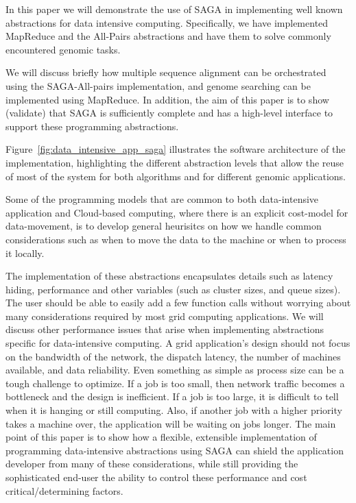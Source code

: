 \documentclass[conference,final]{IEEEtran}
\begin{document}
In this paper we will demonstrate the use of SAGA in implementing well
known abstractions for data intensive computing.  Specifically, we
have implemented MapReduce and the All-Pairs abstractions and have
them to solve commonly encountered genomic tasks.

We will discuss briefly how multiple sequence alignment can be
orchestrated using the SAGA-All-pairs implementation, and genome
searching can be implemented using MapReduce.  In addition, the aim of
this paper is to show (validate) that SAGA is sufficiently complete
and has a high-level interface to support these programming
abstractions.

Figure~\ref{fig:data_intensive_app_saga} illustrates the software
architecture of the implementation, highlighting the different
abstraction levels that allow the reuse of most of the system for both
algorithms and for different genomic applications.

Some of the programming models that are common to both data-intensive
application and Cloud-based computing, where there is an explicit
cost-model for data-movement, is to develop general heurisitcs on how
we handle common considerations such as when to move the data to the
machine or when to process it locally.

The implementation of these abstractions encapsulates details such as
latency hiding, performance and other variables (such as cluster
sizes, and queue sizes).  The user should be able to easily add a few
function calls without worrying about many considerations required by
most grid computing applications.  We will discuss other performance
issues that arise when implementing abstractions specific for
data-intensive computing.  A grid application's design should not
focus on the bandwidth of the network, the dispatch latency, the
number of machines available, and data reliability.  Even something as
simple as process size can be a tough challenge to optimize.  If a job
is too small, then network traffic becomes a bottleneck and the design
is inefficient.  If a job is too large, it is difficult to tell when
it is hanging or still computing.  Also, if another job with a higher
priority takes a machine over, the application will be waiting on jobs
longer.  The main point of this paper is to show how a flexible,
extensible implementation of programming data-intensive abstractions
using SAGA can shield the application developer from many of these
considerations, while still providing the sophisticated end-user the
ability to control these performance and cost critical/determining
factors.
\end{document}
